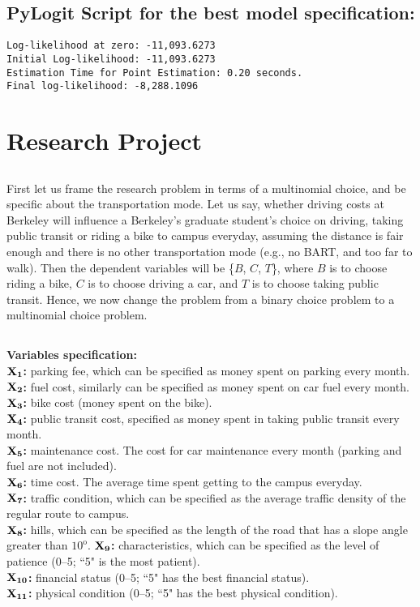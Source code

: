 \documentclass[11pt]{article}
\begin{document}
\subsection*{PyLogit Script for the best model specification:}

\begin{Verbatim}
Log-likelihood at zero: -11,093.6273
Initial Log-likelihood: -11,093.6273
Estimation Time for Point Estimation: 0.20 seconds.
Final log-likelihood: -8,288.1096
\end{Verbatim}
\newpage
\section{Research Project}
\subsection{}
First let us frame the research problem in terms of a multinomial choice, and be specific about the transportation mode. Let us say, whether driving costs at Berkeley will influence a Berkeley's graduate student's choice on driving, taking public transit or riding a bike to campus everyday, assuming the distance is fair enough and there is no other transportation mode (e.g., no BART, and too far to walk). Then the dependent variables will be \{$B$, $C$, $T$\}, where $B$ is to choose riding a bike, $C$ is to choose driving a car, and $T$ is to choose taking public transit. Hence, we now change the problem from a binary choice problem to a multinomial choice problem.
\subsection{}
\textbf{Variables specification:}\\
$\bf{X_1}$\textbf{:} parking fee, which can be specified as money spent on parking every month.\\
$\bf{X_2}$\textbf{:} fuel cost, similarly can be specified as money spent on car fuel every month.\\
$\bf{X_3}$\textbf{:} bike cost (money spent on the bike).\\
$\bf{X_4}$\textbf{:} public transit cost, specified as money spent in taking public transit every month.\\
$\bf{X_5}$\textbf{:} maintenance cost. The cost for car maintenance every month (parking and fuel are not included).\\
$\bf{X_6}$\textbf{:} time cost. The average time spent getting to the campus everyday.\\
$\bf{X_7}$\textbf{:} traffic condition, which can be specified as the average traffic density of the regular route to campus.\\
$\bf{X_8}$\textbf{:} hills, which can be specified as the length of the road that has a slope angle greater than ${10^\text{o}}$.
$\bf{X_9}$\textbf{:} characteristics, which can be specified as the level of patience (0--5; ``5" is the most patient).\\
$\bf{X_{10}}$\textbf{:} financial status (0--5; ``5" has the best financial status).\\
$\bf{X_{11}}$\textbf{:} physical condition (0--5; ``5" has the best physical condition).
\end{document}
